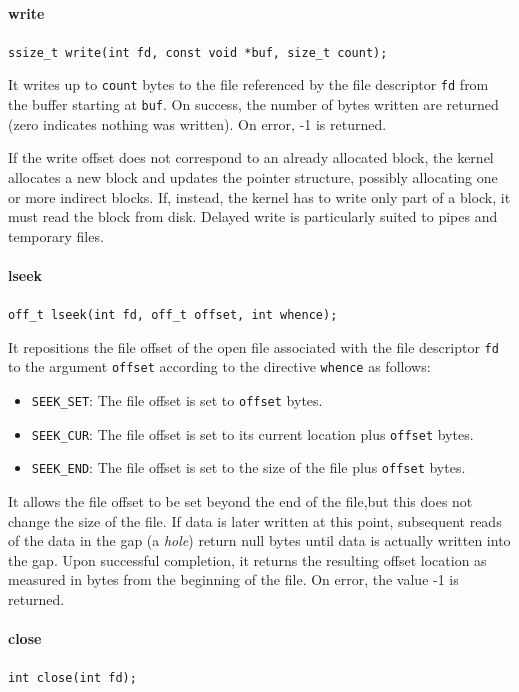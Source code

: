 \documentclass{report}
\begin{document}
\paragraph{write}
\texttt{ssize\_t write(int fd, const void *buf, size\_t count);}

It writes up to \texttt{count} bytes to the file referenced by the file descriptor \texttt{fd} from the buffer starting at \texttt{buf}. On success, the number of bytes written are returned (zero indicates nothing was written). On error, -1 is returned.

If the write offset does not correspond to an already allocated block, the kernel allocates a new block and updates the pointer structure, possibly allocating one or more indirect blocks. If, instead, the kernel has to write only part of a block, it must read the block from disk. Delayed write is particularly suited to pipes and temporary files.

\paragraph{lseek}
\texttt{off\_t lseek(int fd, off\_t offset, int whence);}

It repositions the file offset of the open file associated with the file descriptor \texttt{fd} to the argument \texttt{offset} according to the directive \texttt{whence} as follows:
\begin{itemize}
\item \texttt{SEEK\_SET}: The file offset is set to \texttt{offset} bytes.
\item \texttt{SEEK\_CUR}: The file offset is set to its current location plus \texttt{offset} bytes.
\item \texttt{SEEK\_END}: The file offset is set to the size of the file plus \texttt{offset} bytes.
\end{itemize}
It allows the file offset to be set beyond the end of the file,but this does not change the size of the file. If data is later written at this point, subsequent reads of the data in the gap (a \emph{hole}) return null bytes until data is actually written into the gap. Upon successful completion, it returns the resulting offset location as measured in bytes from the beginning of the file.  On error, the value -1 is returned.

\paragraph{close}
\texttt{int close(int fd);}
\end{document}
